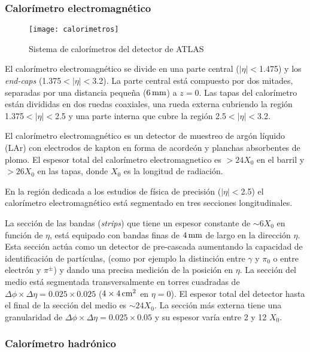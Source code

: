 \subsubsection{Calorímetro electromagnético}

\begin{figure}[!tb]
  \centering

  \texttt{[image: calorimetros]}

  \caption{Sistema de calorímetros del detector de ATLAS}
  \label{fig:calorimetros}

\end{figure}

El calorímetro electromagnético \cite{caloemTDR} se divide en una parte central
($|\eta|<$1.475) y los \emph{end-caps} (1.375$<|\eta|<$3.2). La parte central
está compuesto por dos mitades, separadas por una
distancia pequeña ($\unit[6]{mm}$) a $z = 0$. Las tapas del calorímetro están divididas en
dos ruedas coaxiales, una rueda externa cubriendo la región 1.375$<|\eta|<$2.5 y
una parte interna que cubre la región 2.5$<|\eta|<$3.2.

El calorímetro electromagnético es un detector de muestreo de argón líquido
(LAr) con electrodos de kapton en forma de acordeón y planchas absorbentes de
plomo. El espesor total del calorímetro electromagnetico es $>24 X_0$ en el
barril y $>26 X_0$ en las tapas, donde $X_0$ es la longitud de radiación.

En la región dedicada a los estudios de física de precisión ($|\eta|<$2.5) el
calorímetro electromagnético está segmentado en tres secciones longitudinales.

La sección de las bandas (\emph{strips}) que tiene un espesor constante de
$\sim 6 X_0$ en función de $\eta$, está equipado con bandas finas de $\unit[4]{mm}$ de
largo en la dirección $\eta$. Esta sección actúa como un detector de pre-cascada
aumentando la capacidad de identificación de partículas,
(como por ejemplo la distinción entre $\gamma$ y $\pi_0$ o entre electrón y
$\pi^\pm$) y dando una precisa medición de la posición en $\eta$.
La sección del medio está segmentada transversalmente en torres cuadradas de
$\Delta \phi \times \Delta \eta = 0.025 \times 0.025$ ($4 \times \unit[4]{cm^2}$ en
$\eta=0$). El espesor total del detector hasta el final de la sección del medio
es $\sim 24 X_0$.
La sección más externa tiene una granularidad de
$\Delta\phi\times\Delta\eta = 0.025 \times 0.05$ y su espesor varía entre 2 y 12
$X_0$.


\subsubsection{Calorímetro hadrónico}

